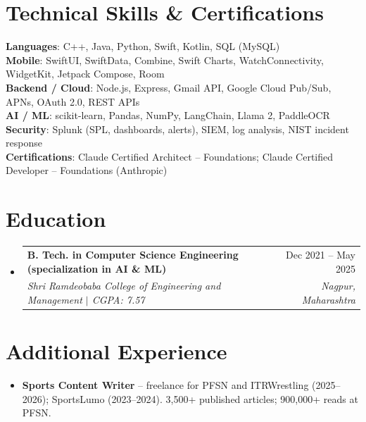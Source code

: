 \documentclass[a4paper,11pt]{article}
\makeatletter
\newcommand{\resumeItem}[1]{\item\small{#1\vspace{-1pt}}}
\newcommand{\resumeSubheading}[4]{
  \vspace{-2pt}\item
    \begin{tabularx}{0.97\textwidth}[t]{@{}>{\raggedright\arraybackslash}X@{\hspace{0.75em}}r@{}}
      \textbf{#1} & #2 \\
      \textit{\small#3} & \textit{\small #4} \\
    \end{tabularx}\vspace{-4pt}
}
\newcommand{\resumeSubItemListStart}{\begin{itemize}[leftmargin=0.15in, label={}]}
\newcommand{\resumeSubItemListEnd}{\end{itemize}}
\newcommand{\resumeItemListStart}{\begin{itemize}[itemsep=1pt]}
\newcommand{\resumeItemListEnd}{\end{itemize}\vspace{-3pt}}
\makeatother
\begin{document}
\section{Technical Skills \& Certifications}
  \begin{itemize}[leftmargin=0.15in, label={}]
    \small{\item{
      \textbf{Languages}{: C++, Java, Python, Swift, Kotlin, SQL (MySQL)} \\
      \textbf{Mobile}{: SwiftUI, SwiftData, Combine, Swift Charts, WatchConnectivity, WidgetKit, Jetpack Compose, Room} \\
      \textbf{Backend / Cloud}{: Node.js, Express, Gmail API, Google Cloud Pub/Sub, APNs, OAuth 2.0, REST APIs} \\
      \textbf{AI / ML}{: scikit-learn, Pandas, NumPy, LangChain, Llama 2, PaddleOCR} \\
      \textbf{Security}{: Splunk (SPL, dashboards, alerts), SIEM, log analysis, NIST incident response} \\
      \textbf{Certifications}{: Claude Certified Architect -- Foundations; Claude Certified Developer -- Foundations (Anthropic)}
    }}
  \end{itemize}

\section{Education}
  \resumeSubItemListStart
    \resumeSubheading
      {B. Tech. in Computer Science Engineering (specialization in AI \& ML)}{Dec 2021 -- May 2025}
      {Shri Ramdeobaba College of Engineering and Management $|$ CGPA: 7.57}{Nagpur, Maharashtra}
  \resumeSubItemListEnd

\section{Additional Experience}
  \resumeItemListStart
    \resumeItem{\textbf{Sports Content Writer} -- freelance for PFSN and ITRWrestling (2025--2026); SportsLumo (2023--2024). 3,500+ published articles; 900,000+ reads at PFSN.}
  \resumeItemListEnd
\end{document}
